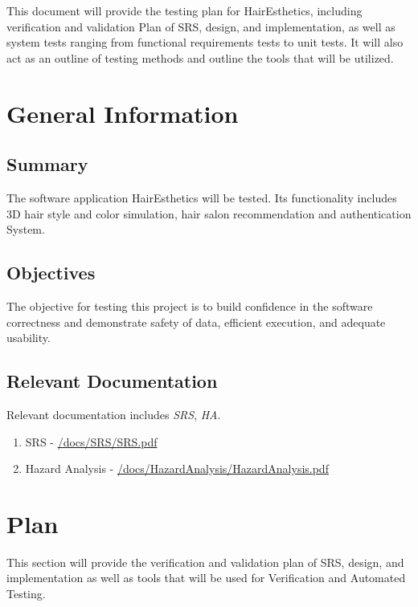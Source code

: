 \documentclass[12pt, titlepage]{article}
\begin{document}
\newpage


This document will provide the testing plan for HairEsthetics, including verification and validation Plan of SRS, design, and implementation, as well as system tests ranging from functional requirements tests to unit tests. It will also act as an outline of testing methods and outline the tools that will be utilized.

\section{General Information}

\subsection{Summary}


  The software application HairEsthetics will be tested. Its functionality includes 3D hair style and color simulation, hair salon recommendation and authentication System.

\subsection{Objectives}

The objective for testing this project is to build confidence in the software correctness and demonstrate
safety of data, efficient execution, and adequate usability. 

\subsection{Relevant Documentation}

Relevant documentation includes \textit{SRS}, \textit{HA}.
\begin{enumerate}
    \item SRS - \href{https://github.com/marlon4dashen/Hairesthetics/blob/main/docs/SRS/SRS.pdf}{/docs/SRS/SRS.pdf}
    \item Hazard Analysis - \href{https://github.com/marlon4dashen/Hairesthetics/blob/main/docs/HazardAnalysis/HazardAnalysis.pdf}{/docs/HazardAnalysis/HazardAnalysis.pdf}
\end{enumerate}
\section{Plan}

This section will provide the verification and validation plan of SRS, design, and implementation as well as tools that will be used for Verification and Automated Testing.
  
\end{document}

